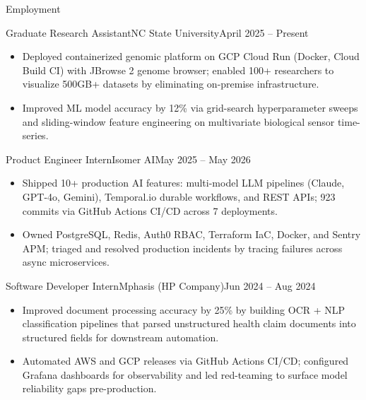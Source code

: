 \documentclass[]{mcdowellcv}
\begin{document}
\makeheader

\begin{cvsection}{Employment}
  \begin{cvsubsection}{Graduate Research Assistant}{NC State University}{April 2025 -- Present}
    \begin{itemize}
      \item Deployed containerized genomic platform on GCP Cloud Run (Docker, Cloud Build CI) with JBrowse 2 genome browser; enabled 100+ researchers to visualize 500GB+ datasets by eliminating on-premise infrastructure.
      \item Improved ML model accuracy by 12\% via grid-search hyperparameter sweeps and sliding-window feature engineering on multivariate biological sensor time-series.
    \end{itemize}
    \vspace{-1.5pt}
  \end{cvsubsection}

  \begin{cvsubsection}{Product Engineer Intern}{Isomer AI}{May 2025 -- May 2026}
    \begin{itemize}
      \item Shipped 10+ production AI features: multi-model LLM pipelines (Claude, GPT-4o, Gemini), Temporal.io durable workflows, and REST APIs; 923 commits via GitHub Actions CI/CD across 7 deployments.
      \item Owned PostgreSQL, Redis, Auth0 RBAC, Terraform IaC, Docker, and Sentry APM; triaged and resolved production incidents by tracing failures across async microservices.
    \end{itemize}
    \vspace{-1.5pt}
  \end{cvsubsection}

  \begin{cvsubsection}{Software Developer Intern}{Mphasis (HP Company)}{Jun 2024 -- Aug 2024}
    \begin{itemize}
      \item Improved document processing accuracy by 25\% by building OCR + NLP classification pipelines that parsed unstructured health claim documents into structured fields for downstream automation.
      \item Automated AWS and GCP releases via GitHub Actions CI/CD; configured Grafana dashboards for observability and led red-teaming to surface model reliability gaps pre-production.
    \end{itemize}
    \vspace{-1.5pt}
  \end{cvsubsection}


\end{cvsection}
\end{document}
